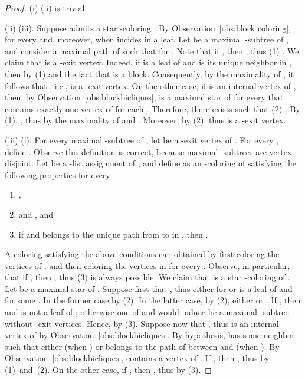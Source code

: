 \documentclass[a4paper, 11pt, oneside]{article}
\begin{document}
\begin{proof}
   (i)  (ii) is trivial.  

   (ii)  (iii).  Suppose  admits a star -coloring .  By Observation~\ref{obs:block coloring},  for every  and, moreover,  when  incides in a leaf.  Let  be a maximal -subtree of , and consider a maximal path  of  such that  for .   Note that if , then , thus (1) .   We claim that  is a -exit vertex.  Indeed, if  is a leaf of  and  is its unique neighbor in , then  by (1) and the fact that  is a block.  Consequently, by the maximality of , it follows that , i.e.,  is a -exit vertex.  On the other case, if  is an internal vertex of , then, by Observation~\ref{obs:blockbicliques},  is a maximal star of  for every  that contains exactly one vertex of  for each .  Therefore, there exists  such that (2) .  By (1), , thus  by the maximality of  and .  Moreover,  by (2), thus  is a -exit vertex.
   
   (iii)  (i).  For every maximal -subtree  of , let  be a -exit vertex of .  For every , define .  Observe this definition is correct, because maximal -subtrees are vertex-disjoint.  Let  be a -list assignment of , and define  as an -coloring of  satisfying the following properties for every .  
  \begin{enumerate}[(1)]
    \item ,
    \item  and , and
    \item if  and  belongs to the unique path from  to  in , then .
  \end{enumerate}
  A coloring satisfying the above conditions can obtained by first coloring the vertices of , and then coloring the vertices in  for every .  Observe, in particular, that if , then , thus (3) is always possible.  We claim that  is a star -coloring of .  Let  be a maximal star of .  Suppose first that , thus either  for  or  is a leaf of  and  for some .  In the former case  by (2).  In the latter case, by (2), either  or .  If , then  and  is not a leaf of ; otherwise one of  and  would induce be a maximal -subtree without -exit vertices.  Hence,  by (3).  Suppose now that , thus  is an internal vertex of  by Observation~\ref{obs:blockbicliques}.  By hypothesis,  has some neighbor  such that either  (when ) or  belongs to the path of  between  and  (when ).  By Observation~\ref{obs:blockbicliques},  contains a vertex  of .  If , then , thus   by (1)~and~(2).  On the other case, if , then , thus  by (3).
\end{proof}
 
\end{document}
